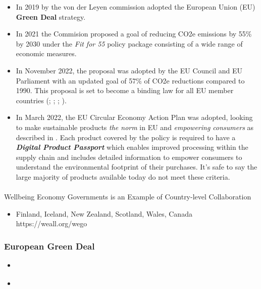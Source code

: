 \documentclass[
  letterpaper,
  DIV=11,
  numbers=noendperiod]{scrartcl}
\makeatletter
\let\oldparagraph\paragraph
\renewcommand{\paragraph}{
    \@ifstar
      \xxxParagraphStar
      \xxxParagraphNoStar
  }
\newcommand{\xxxParagraphStar}[1]{\oldparagraph*{#1}\mbox{}}
\newcommand{\xxxParagraphNoStar}[1]{\oldparagraph{#1}\mbox{}}
\providecommand{\tightlist}{%
  \setlength{\itemsep}{0pt}\setlength{\parskip}{0pt}}\usepackage{longtable,booktabs,array}
\makeatother
\begin{document}
\begin{itemize}
\item
  In 2019 by the von der Leyen commission adopted the European Union
  (EU) \textbf{Green Deal} strategy.
\item
  In 2021 the Commision proposed a goal of reducing CO2e emissions by
  55\% by 2030 under the \emph{Fit for 55} policy package consisting of
  a wide range of economic measures.
\item
  In November 2022, the proposal was adopted by the EU Council and EU
  Parliament with an updated goal of 57\% of CO2e reductions compared to
  1990. This proposal is set to become a binding law for all EU member
  countries (\citet{europeancommissionEuropeanGreenDeal2019};
  \citet{europeancommissionSustainableEurope20302019};
  \citet{EUReachesAgreement2022}; \citet{europeancouncilFit55EU2022}).
\item
  In March 2022, the EU Circular Economy Action Plan was adopted,
  looking to make sustainable products \emph{the norm} in EU and
  \emph{empowering consumers} as described in
  \citet{europeancommissionCircularEconomyAction2022}. Each product
  covered by the policy is required to have a \textbf{\emph{Digital
  Product Passport}} which enables improved processing within the supply
  chain and includes detailed information to empower consumers to
  understand the environmental footprint of their purchases. It's safe
  to say the large majority of products available today do not meet
  these criteria.
\end{itemize}

\paragraph{Wellbeing Economy Governments is an Example of Country-level
Collaboration}\label{wellbeing-economy-governments-is-an-example-of-country-level-collaboration}

\begin{itemize}
\tightlist
\item
  Finland, Iceland, New Zealand, Scotland, Wales, Canada
  https://weall.org/wego
\end{itemize}

\subsubsection{European Green Deal}\label{european-green-deal}

\begin{itemize}
\tightlist
\item
  \citet{EuropeanGreenDeal2021}
\item
  \citet{switch2greenEUGreenDeal2023}
\end{itemize}
\end{document}

